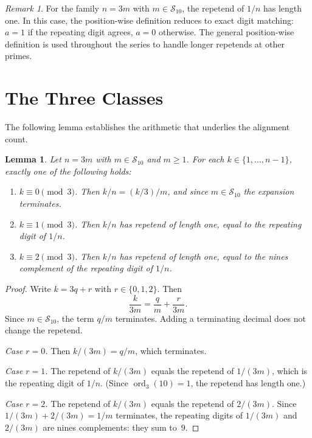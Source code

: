 \documentclass[12pt]{amsart}
\newtheorem{lemma}[theorem]{Lemma}
\theoremstyle{definition}
\theoremstyle{remark}
\newtheorem{remark}[theorem]{Remark}
\begin{document}
\begin{remark}
For the family $n = 3m$ with $m \in \mathcal{S}_{10}$, the
repetend of $1/n$ has length one. In this case, the position-wise
definition reduces to exact digit matching: $a = 1$ if the
repeating digit agrees, $a = 0$ otherwise. The general
position-wise definition is used throughout the series to handle
longer repetends at other primes.
\end{remark}

\section{The Three Classes}

The following lemma establishes the arithmetic that underlies the
alignment count.

\begin{lemma}\label{lem:three-classes}
Let $n = 3m$ with $m \in \mathcal{S}_{10}$ and $m \ge 1$. For each
$k \in \{1,\ldots,n{-}1\}$, exactly one of the following holds:
\begin{enumerate}
\item[\textup{(A)}]
$k \equiv 0 \pmod{3}$. Then $k/n = (k/3)/m$, and since
$m \in \mathcal{S}_{10}$ the expansion terminates.
\item[\textup{(B)}]
$k \equiv 1 \pmod{3}$. Then $k/n$ has repetend of length one,
equal to the repeating digit of $1/n$.
\item[\textup{(C)}]
$k \equiv 2 \pmod{3}$. Then $k/n$ has repetend of length one,
equal to the nines complement of the repeating digit of $1/n$.
\end{enumerate}
\end{lemma}

\begin{proof}
Write $k = 3q + r$ with $r \in \{0,1,2\}$. Then
\[
\frac{k}{3m} = \frac{q}{m} + \frac{r}{3m}.
\]
Since $m \in \mathcal{S}_{10}$, the term $q/m$ terminates.
Adding a terminating decimal does not change the repetend.

\medskip\noindent
\emph{Case $r=0$.}
Then $k/(3m) = q/m$, which terminates.

\medskip\noindent
\emph{Case $r=1$.}
The repetend of $k/(3m)$ equals the repetend of
$1/(3m)$, which is the repeating digit of $1/n$.
(Since $\operatorname{ord}_{3}(10) = 1$, the repetend
has length one.)

\medskip\noindent
\emph{Case $r=2$.}
The repetend of $k/(3m)$ equals the repetend of
$2/(3m)$. Since $1/(3m) + 2/(3m) = 1/m$ terminates,
the repeating digits of $1/(3m)$ and $2/(3m)$ are
nines complements: they sum to~$9$.
\end{proof}
\end{document}
